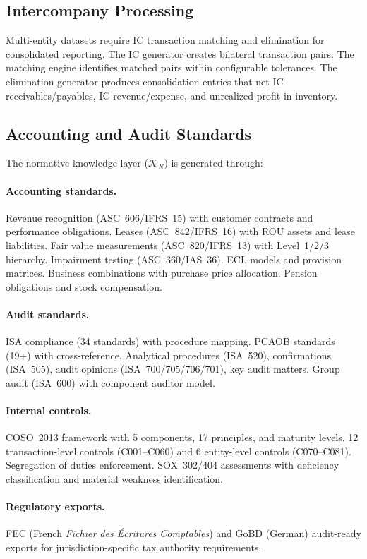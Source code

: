 \subsection{Intercompany Processing}
\label{sec:gen_intercompany}

Multi-entity datasets require IC transaction matching and elimination
for consolidated reporting.  The IC generator creates bilateral
transaction pairs.  The matching engine identifies matched pairs within
configurable tolerances.  The elimination generator produces
consolidation entries that net IC receivables/payables, IC
revenue/expense, and unrealized profit in inventory.

\subsection{Accounting and Audit Standards}
\label{sec:gen_standards}

The normative knowledge layer ($\mathcal{K}_N$) is generated through:

\paragraph{Accounting standards.}
Revenue recognition (ASC~606/IFRS~15) with customer contracts and
performance obligations.  Leases (ASC~842/IFRS~16) with ROU assets and
lease liabilities.  Fair value measurements (ASC~820/IFRS~13) with
Level~1/2/3 hierarchy.  Impairment testing (ASC~360/IAS~36).  ECL models
and provision matrices.  Business combinations with purchase price
allocation.  Pension obligations and stock compensation.

\paragraph{Audit standards.}
ISA compliance (34 standards) with procedure mapping.  PCAOB standards
(19+) with cross-reference.  Analytical procedures (ISA~520),
confirmations (ISA~505), audit opinions (ISA~700/705/706/701), key
audit matters.  Group audit (ISA~600) with component auditor model.

\paragraph{Internal controls.}
COSO~2013 framework with 5 components, 17 principles, and maturity
levels.  12 transaction-level controls (C001--C060) and 6 entity-level
controls (C070--C081).  Segregation of duties enforcement.
SOX~302/404 assessments with deficiency classification and material
weakness identification.

\paragraph{Regulatory exports.}
FEC (French \emph{Fichier des \'{E}critures Comptables}) and GoBD
(German) audit-ready exports for jurisdiction-specific tax authority
requirements.
